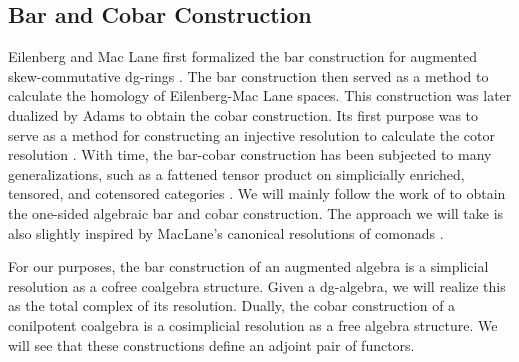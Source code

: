 \documentclass[../thesis.tex]{subfiles}
\begin{document}
    \subsection{Bar and Cobar Construction}

            Eilenberg and Mac Lane first formalized the bar construction for augmented skew-commutative dg-rings \cite{Eilenberg53}. The bar construction then served as a method to calculate the homology of Eilenberg-Mac Lane spaces. This construction was later dualized by Adams \cite{Adams56} to obtain the cobar construction. Its first purpose was to serve as a method for constructing an injective resolution to calculate the cotor resolution \cite{Eilenberg65}. With time, the bar-cobar construction has been subjected to many generalizations, such as a fattened tensor product on simplicially enriched, tensored, and cotensored categories \cite{Riehl14}. We will mainly follow the work of \cite{Loday12} to obtain the one-sided algebraic bar and cobar construction. The approach we will take is also slightly inspired by MacLane's canonical resolutions of comonads \cite{MacLane71}.

            For our purposes, the bar construction of an augmented algebra is a simplicial resolution as a cofree coalgebra structure. Given a dg-algebra, we will realize this as the total complex of its resolution. Dually, the cobar construction of a conilpotent coalgebra is a cosimplicial resolution as a free algebra structure. We will see that these constructions define an adjoint pair of functors.


\end{document}
